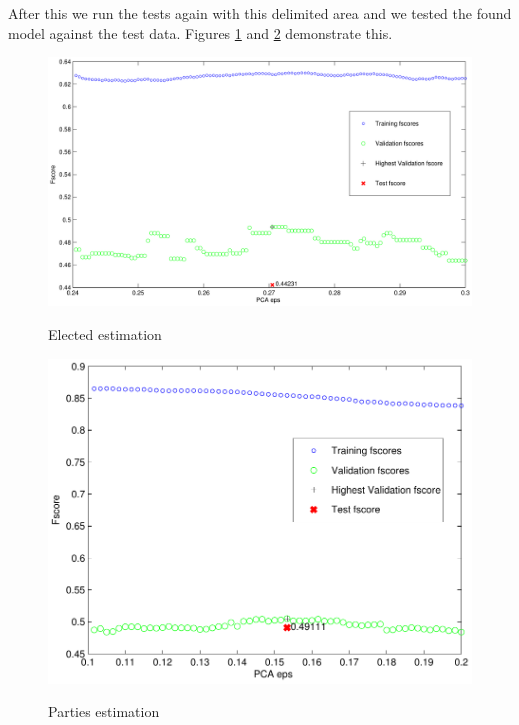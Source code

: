 \documentclass[a4paper,10pt]{article}
\begin{document}
After this we run the tests again with this delimited area and we tested the found model against the test data. Figures \ref{fig:elecTest} and \ref{fig:partiesTest} demonstrate this.

\begin{figure}
\begin{center}
	\caption{Elected estimation}
	{\includegraphics[scale=0.5,angle=0]{./lda_elec_test.pdf}}
	\label{fig:elecTest}
\end{center}
\end{figure}


\begin{figure}
\begin{center}
	\caption{Parties estimation}
	{\includegraphics[scale=0.5,angle=0]{./lda_party_test.pdf}}
	\label{fig:partiesTest}
\end{center}
\end{figure}
\end{document}
